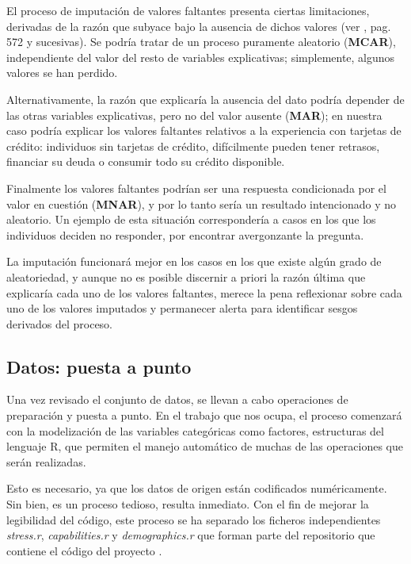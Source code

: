 \documentclass[a4paper, 11pt]{article}
\begin{document}
El proceso de imputación de valores faltantes presenta ciertas limitaciones, derivadas de la
razón que subyace bajo la ausencia de dichos valores (ver \cite{lantz23}, pag. 572 y sucesivas). Se podría tratar de un proceso puramente aleatorio (\textbf{MCAR}), independiente 
del valor del resto de variables explicativas; simplemente, algunos valores se han perdido. 

Alternativamente, la razón que explicaría la ausencia del dato podría depender de las otras 
variables explicativas, pero no del valor ausente (\textbf{MAR}); en nuestra caso podría 
explicar los valores faltantes relativos a la experiencia con tarjetas de crédito: 
individuos sin tarjetas de crédito, difícilmente pueden tener retrasos, financiar su deuda o 
consumir todo su crédito disponible.

Finalmente los valores faltantes podrían ser una respuesta condicionada por el valor en cuestión (\textbf{MNAR}), y por lo tanto sería un resultado intencionado y no aleatorio. Un ejemplo de 
esta situación correspondería a casos en los que los individuos deciden no responder, por 
encontrar avergonzante la pregunta.

La imputación funcionará mejor en los casos en los que existe algún grado de aleatoriedad, y aunque no es posible discernir a priori la razón última que explicaría 
cada uno de los valores faltantes, merece la pena reflexionar sobre cada uno de los valores
imputados y permanecer alerta para identificar sesgos derivados del proceso.

\subsection{Datos: puesta a punto}
\label{sec:data_grooming}
Una vez revisado el conjunto de datos, se llevan a cabo operaciones de preparación y
puesta a punto. En el trabajo que nos ocupa, el proceso comenzará con la modelización
de las variables categóricas como factores, estructuras del lenguaje R, que permiten
el manejo automático de muchas de las operaciones que serán realizadas. 

Esto es necesario, ya que los datos de origen están codificados numéricamente. Sin bien, es un proceso tedioso, resulta inmediato. Con el fin de mejorar la legibilidad del código, este proceso se ha separado los ficheros independientes \textit{stress.r},
\textit{capabilities.r} y \textit{demographics.r} que forman parte del repositorio
que contiene el código del proyecto \cite{ALMO25}.
\end{document}
